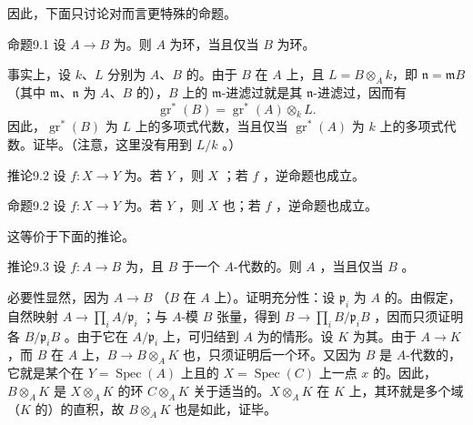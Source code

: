 因此，下面只讨论对而言更特殊的命题。
\begin{SGAresult}{命题}{9.1}
设 $A\to B$ 为。则 $A$ 为环，当且仅当 $B$ 为环。
\end{SGAresult}
事实上，设 $k$、$L$ 分别为 $A$、$B$ 的。由于 $B$ 在 $A$ 上，且 $L=B\otimes_A k$，即 $\mathfrak n=\mathfrak m B$（其中 $\mathfrak m$、$\mathfrak n$ 为 $A$、$B$ 的），$B$ 上的 $\mathfrak m$-进滤过就是其 $\mathfrak n$-进滤过，因而有
\[
 \operatorname{gr}^*(B)=\operatorname{gr}^*(A)\otimes_k L.
\]
因此，$\operatorname{gr}^*(B)$ 为 $L$ 上的多项式代数，当且仅当 $\operatorname{gr}^*(A)$ 为 $k$ 上的多项式代数。证毕。（注意，这里没有用到 $L/k$ 。）
\begin{SGAresult}{推论}{9.2}
设 $f\colon X\to Y$ 为。若 $Y$ ，则 $X$ ；若 $f$ ，逆命题也成立。
\end{SGAresult}
\begin{SGAresult}{命题}{9.2}
设 $f\colon X\to Y$ 为。若 $Y$ ，则 $X$ 也；若 $f$ ，逆命题也成立。
\end{SGAresult}
这等价于下面的推论。
\begin{SGAresult}{推论}{9.3}
设 $f\colon A\to B$ 为，且 $B$ 于一个 $A$-代数的。则 $A$ ，当且仅当 $B$ 。
\end{SGAresult}
必要性显然，因为 $A\to B$ （$B$ 在 $A$ 上）。证明充分性：设 $\mathfrak p_i$ 为 $A$ 的。由假定，自然映射 $A\to\prod_i A/\mathfrak p_i$ ；与 $A$-模 $B$ 张量，得到 $B\to\prod_i B/\mathfrak p_iB$ ，因而只须证明各 $B/\mathfrak p_iB$ 。由于它在 $A/\mathfrak p_i$ 上，可归结到 $A$ 为的情形。设 $K$ 为其。由于 $A\to K$ ，而 $B$ 在 $A$ 上，$B\to B\otimes_A K$ 也，只须证明后一个环。又因为 $B$ 是 $A$-代数的，它就是某个在 $Y=\operatorname{Spec}(A)$ 上且的 $X=\operatorname{Spec}(C)$ 上一点 $x$ 的。因此，$B\otimes_A K$ 是 $X\otimes_A K$ 的环 $C\otimes_A K$ 关于适当的。$X\otimes_A K$ 在 $K$ 上，其环就是多个域（$K$ 的）的直积，故 $B\otimes_A K$ 也是如此，证毕。
